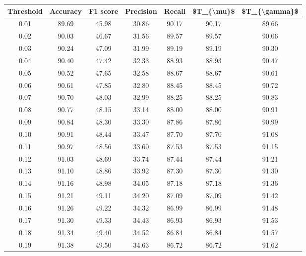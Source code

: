 \begin{tabular}{|c|c|c|c|c|c|c|}
\hline
 Threshold &  Accuracy &  F1 score &  Precision &  Recall &  \$T\_\{\textbackslash mu\}\$ &  \$T\_\{\textbackslash gamma\}\$ \\
\hline
      0.01 &     89.69 &     45.98 &      30.86 &   90.17 &      90.17 &         89.66 \\
      0.02 &     90.03 &     46.67 &      31.56 &   89.57 &      89.57 &         90.06 \\
      0.03 &     90.24 &     47.09 &      31.99 &   89.19 &      89.19 &         90.30 \\
      0.04 &     90.40 &     47.42 &      32.33 &   88.93 &      88.93 &         90.47 \\
      0.05 &     90.52 &     47.65 &      32.58 &   88.67 &      88.67 &         90.61 \\
      0.06 &     90.61 &     47.85 &      32.80 &   88.45 &      88.45 &         90.72 \\
      0.07 &     90.70 &     48.03 &      32.99 &   88.25 &      88.25 &         90.83 \\
      0.08 &     90.77 &     48.15 &      33.14 &   88.00 &      88.00 &         90.91 \\
      0.09 &     90.84 &     48.30 &      33.30 &   87.86 &      87.86 &         90.99 \\
      0.10 &     90.91 &     48.44 &      33.47 &   87.70 &      87.70 &         91.08 \\
      0.11 &     90.97 &     48.56 &      33.60 &   87.53 &      87.53 &         91.15 \\
      0.12 &     91.03 &     48.69 &      33.74 &   87.44 &      87.44 &         91.21 \\
      0.13 &     91.10 &     48.86 &      33.92 &   87.30 &      87.30 &         91.30 \\
      0.14 &     91.16 &     48.98 &      34.05 &   87.18 &      87.18 &         91.36 \\
      0.15 &     91.21 &     49.11 &      34.20 &   87.09 &      87.09 &         91.42 \\
      0.16 &     91.26 &     49.22 &      34.32 &   86.99 &      86.99 &         91.48 \\
      0.17 &     91.30 &     49.33 &      34.43 &   86.93 &      86.93 &         91.53 \\
      0.18 &     91.34 &     49.40 &      34.52 &   86.84 &      86.84 &         91.57 \\
      0.19 &     91.38 &     49.50 &      34.63 &   86.72 &      86.72 &         91.62 \\

\end{tabular}
